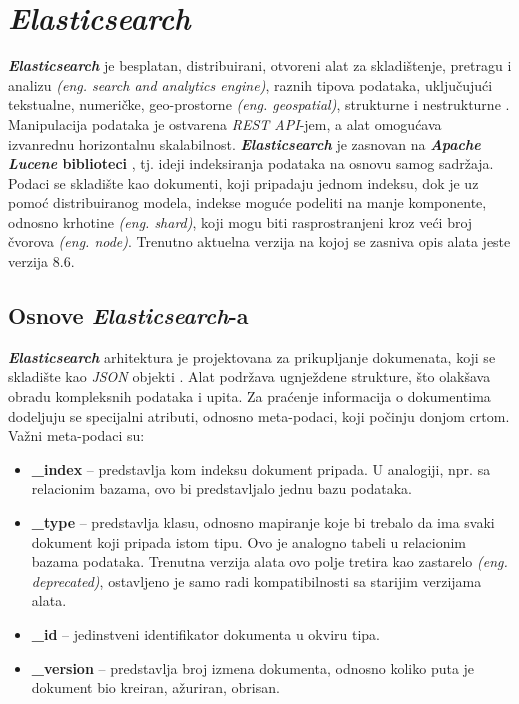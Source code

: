 \section{\textit{\textbf{Elasticsearch}}}
\textit{\textbf{Elasticsearch}} je besplatan, distribuirani, otvoreni alat za skladištenje, pretragu i analizu \textit{(eng. search and analytics engine)}, raznih tipova podataka, uključujući tekstualne, numeričke, geo-prostorne \textit{(eng. geospatial)}, strukturne i nestrukturne \cite{elastic-elasticsearch}. Manipulacija podataka je ostvarena \textit{REST API}-jem, a alat omogućava izvanrednu horizontalnu skalabilnost. \textit{\textbf{Elasticsearch}} je zasnovan na \textbf{\textit{Apache Lucene} biblioteci} \cite{apache-lucene}, tj. ideji indeksiranja podataka na osnovu samog sadržaja. Podaci se skladište kao dokumenti, koji pripadaju jednom indeksu, dok je uz pomoć distribuiranog modela, indekse moguće podeliti na manje komponente, odnosno krhotine \textit{(eng. shard)}, koji mogu biti rasprostranjeni kroz veći broj čvorova \textit{(eng. node)}. Trenutno aktuelna verzija na kojoj se zasniva opis alata jeste verzija 8.6.

\subsection{Osnove \textit{\textbf{Elasticsearch}}-a}\label{subsection:osnove-elasticsearch-a}
\textit{\textbf{Elasticsearch}} arhitektura je projektovana za prikupljanje dokumenata, koji se skladište kao \textit{JSON} objekti \cite{json}. Alat podržava ugnježdene strukture, što olakšava obradu kompleksnih podataka i upita. Za praćenje informacija o dokumentima dodeljuju se specijalni atributi, odnosno meta-podaci, koji počinju donjom crtom. Važni meta-podaci su:
\begin{itemize}
    \item \textbf{\_index} – predstavlja kom indeksu dokument pripada. U analogiji, npr. sa relacionim bazama, ovo bi predstavljalo jednu bazu podataka.
    \item \textbf{\_type} – predstavlja klasu, odnosno mapiranje koje bi trebalo da ima svaki dokument koji pripada istom tipu. Ovo je analogno tabeli u relacionim bazama podataka. Trenutna verzija alata ovo polje tretira kao zastarelo \textit{(eng. deprecated)}, ostavljeno je samo radi kompatibilnosti sa starijim verzijama alata.
    \item \textbf{\_id} – jedinstveni identifikator dokumenta u okviru tipa.
    \item \textbf{\_version} – predstavlja broj izmena dokumenta, odnosno koliko puta je dokument bio kreiran, ažuriran, obrisan.
\end{itemize}

